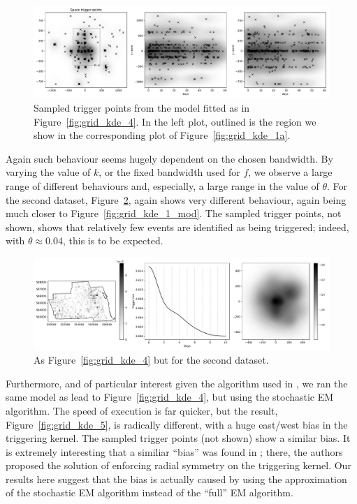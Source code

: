 \documentclass[twoside,a4paper]{article}
\theoremstyle{plain}
\theoremstyle{definition}
\begin{document}
\begin{figure}
  \includegraphics[width=\textwidth]{../notebooks/grid_kde_knn2.pdf}
  \caption{Sampled trigger points from the model fitted as in Figure~\ref{fig:grid_kde_4}.
  In the left plot, outlined is the region we show in the corresponding plot of
  Figure~\ref{fig:grid_kde_1a}.}
  \label{fig:grid_kde_4a}
\end{figure}

Again such behaviour seems hugely dependent on the chosen bandwidth.  By varying the
value of $k$, or the fixed bandwidth used for $f$, we observe a large range of different behaviours
and, especially, a large range in the value of $\theta$.  For the second dataset,
Figure~\ref{fig:grid_kde_mod_4}, again shows very different behaviour, again being much
closer to Figure~\ref{fig:grid_kde_1_mod}.  The sampled trigger points, not shown, shows
that relatively few events are identified as being triggered; indeed, with $\theta \approx
0.04$, this is to be expected.

\begin{figure}
  \includegraphics[width=\textwidth]{../notebooks/grid_kde_knn1_mod.pdf}
  \caption{As Figure~\ref{fig:grid_kde_4} but for the second dataset.}
  \label{fig:grid_kde_mod_4}
\end{figure}

Furthermore, and of particular interest given the algorithm used in \cite{sepp}, we ran the same
model as lead to Figure~\ref{fig:grid_kde_4}, but using the stochastic EM algorithm.  The speed of
execution is far quicker, but the result, Figure~\ref{fig:grid_kde_5}, is radically different, with
a huge east/west bias in the triggering kernel.  The sampled trigger points (not shown) show a similar
bias.  It is extremely interesting that a similiar ``bias'' was found in \cite{rc}; there, the
authors proposed the solution of enforcing radial symmetry on the triggering kernel.  Our results
here suggest that the bias is actually caused by using the approximation of the stochastic EM
algorithm instead of the ``full'' EM algorithm.
\end{document}
